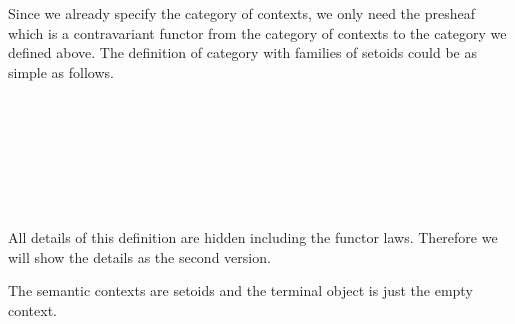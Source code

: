 \begin{code}
\\
\>[15]\<[17]%
\>[17]    \AgdaSymbol{(}\AgdaFunction{[}  \AgdaFunction{]fn} \AgdaSymbol{)}   \AgdaSymbol{)\})}\<%
\\
\>[0]\<[15]%
\>[15]\AgdaSymbol{(} \<[23]%
\>[23]\<%
\\
\>[0]\<[17]%
\>[17]     \AgdaSymbol{)} \<[37]%
\>[37]\<%
\\
\>[0]\<[17]%
\>[17]     \AgdaSymbol{)} \<[37]%
\>[37]\<%
\\
\>[0]\<[17]%
\>[17]       \AgdaSymbol{))}\<%
\\
%
\\
\>\<\end{code}

Since we already specify the category of contexts, we only need the presheaf which is a contravariant functor from the category of contexts to the category we defined above. The definition of category with families of setoids could be as simple as follows.

\begin{code}\>\<%
\\
%
\\
\>  \AgdaSymbol{:}  \<%
\\
\>[0]\<[2]%
\>[2]\<%
\\
\>[0]\<[4]%
\>[4] \AgdaSymbol{:}  \AgdaSymbol{(} \AgdaSymbol{)} \<%
\\
%
\\
\>\<\end{code}

All details of this definition are hidden including the functor laws. Therefore we will show the details as the second version.

The semantic contexts are setoids and the terminal object is just the empty context. 


